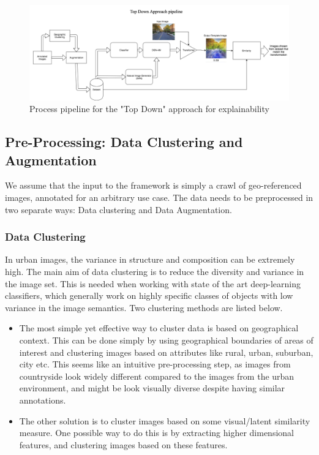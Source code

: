  \begin{figure}[ht]
	\centering
	\includegraphics[width=1.8\columnwidth]{Plot/ExplainabilityPipeline_abstract.png}
	\caption{Process pipeline for the "Top Down" approach for explainability}
    \label{fig:pipeline}
\end{figure}

\subsection{Pre-Processing: Data Clustering and Augmentation}
We assume that the input to the framework is simply a crawl of geo-referenced images, annotated for an arbitrary use case. The data needs to be preprocessed in two separate ways: Data clustering and Data Augmentation.
\subsubsection{Data Clustering}
In urban images, the variance in structure and composition %
can be extremely high. 
The main aim of data clustering is to reduce the diversity and variance in the image set. This is needed when working with  state of the art deep-learning classifiers, which generally work on highly specific classes of objects with low variance in the image semantics. Two clustering methods are listed below.
\begin{itemize}
	\item The most simple yet effective way to cluster data %
	is based on geographical context. This can be done simply by using geographical boundaries of areas of interest and clustering images based on attributes like rural, urban, suburban, city etc.  This seems like an intuitive pre-processing step, as images from countryside look widely different compared to the images from the urban environment, and might be look visually diverse despite having similar annotations.
	\item %
	The other solution is to cluster images based on some visual/latent similarity measure. One possible way to do this is by extracting higher dimensional features, and clustering images based on these features.
\end{itemize} 

